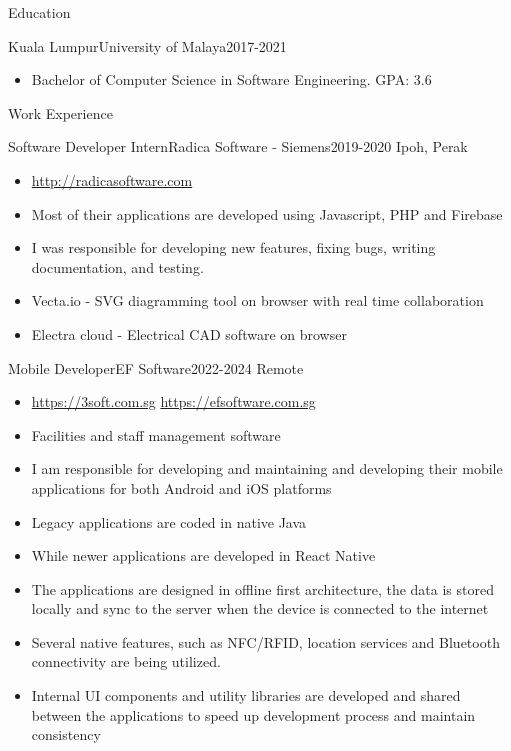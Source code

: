 \documentclass[]{mcdowellcv}
\begin{document}
\makeheader


\begin{cvsection}{Education}
	\begin{cvsubsection}{Kuala Lumpur}{University of Malaya}{2017-2021}
		\begin{itemize}
			\item Bachelor of Computer Science in Software Engineering. GPA: 3.6
		\end{itemize}
	\end{cvsubsection}
\end{cvsection}
\begin{cvsection}{Work Experience}
	\begin{cvsubsection}{Software Developer Intern}{Radica Software - Siemens}{2019-2020}
		Ipoh, Perak
		\begin{itemize}%
			\item \url{http://radicasoftware.com}
			\item Most of their applications are developed using Javascript, PHP and Firebase
			\item I was responsible for developing new features, fixing bugs, writing documentation, and testing.
			\item Vecta.io - SVG diagramming tool on browser with real time collaboration
			\item Electra cloud - Electrical CAD software on browser
		\end{itemize}
	\end{cvsubsection}
	\begin{cvsubsection}{Mobile Developer}{EF Software}{2022-2024}
		Remote
		\begin{itemize}%
			\item \url{https://3soft.com.sg} \quad\url{https://efsoftware.com.sg}
			\item Facilities and staff management software
			\item I am responsible for developing and maintaining and developing their mobile applications for both Android and iOS platforms
			\item Legacy applications are coded in native Java
			\item While newer applications are developed in React Native
			\item The applications are designed in offline first architecture, the data is stored locally and sync to the server when the device is connected to the internet
			\item Several native features, such as NFC/RFID, location services and Bluetooth connectivity are being utilized.
			\item Internal UI components and utility libraries are developed and shared between the applications to speed up development process and maintain consistency
		\end{itemize}
	\end{cvsubsection}
\end{cvsection}
\end{document}
